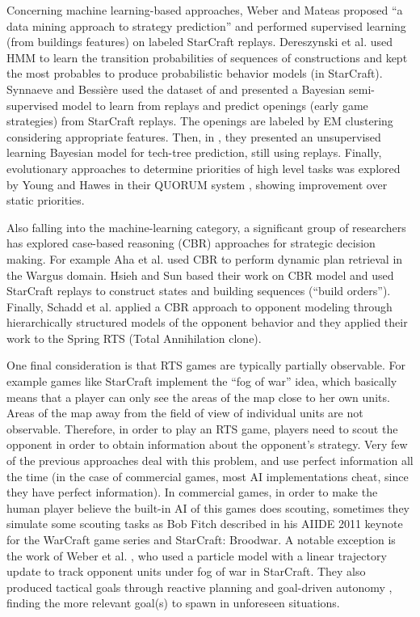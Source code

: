 \documentclass[journal]{IEEEtran}
\begin{document}
Concerning machine learning-based approaches, Weber and Mateas \cite{WeberCig09} proposed ``a data mining approach to strategy prediction'' and performed supervised learning (from buildings features) on labeled StarCraft replays. Dereszynski et al. \cite{HMMstrat_RTS_AIIDE11} used HMM to learn the transition probabilities of sequences of constructions and kept the most probables to produce probabilistic behavior models (in StarCraft). Synnaeve and Bessi\`{e}re \cite{SynnaeveOpeningCig11} used the dataset of \cite{WeberCig09} and presented a Bayesian semi-supervised model to learn from replays and predict openings (early game strategies) from StarCraft replays. The openings are labeled by EM clustering considering appropriate features. Then, in \cite{SynnaeveAIIDE11}, they presented an unsupervised learning Bayesian model for tech-tree prediction, still using replays. %
Finally, evolutionary approaches to determine priorities of high level tasks was explored by Young and Hawes in their QUORUM system \cite{young2012evolutionary}, showing improvement over static priorities.

Also falling into the machine-learning category, a significant group of researchers has explored case-based reasoning (CBR) \cite{Aamodt94CBR} approaches for strategic decision making. For example Aha et al. \cite{LTW} used CBR to perform dynamic plan retrieval in the Wargus domain. Hsieh and Sun \cite{HsiehS08} based their work on \cite{LTW} CBR model and used StarCraft replays to construct states and building sequences (``build orders''). Finally, Schadd et al. \cite{SchaddBS07} applied a CBR approach to opponent modeling through hierarchically structured models of the opponent behavior and they applied their work to the Spring RTS (Total Annihilation clone).

One final consideration is that RTS games are typically partially observable. For example games like StarCraft implement the ``fog of war'' idea, which basically means that a player can only see the areas of the map close to her own units. Areas of the map away from the field of view of individual units are not observable. Therefore, in order to play an RTS game, players need to scout the opponent in order to obtain information about the opponent's strategy. Very few of the previous approaches deal with this problem, and use perfect information all the time (in the case of commercial games, most AI implementations cheat, since they have perfect information). In commercial games, in order to make the human player believe the built-in AI of this games does scouting, sometimes they simulate some scouting tasks as Bob Fitch described in his AIIDE 2011 keynote for the WarCraft game series and StarCraft: Broodwar. A notable exception is the work of Weber et al. \cite{WeberAIIDE11}, who used a particle model with a linear trajectory update to track opponent units under fog of war in StarCraft. They also produced tactical goals through reactive planning and goal-driven autonomy \cite{WeberCig10,Weber10}, finding the more relevant goal(s) to spawn in unforeseen situations. 
\end{document}
